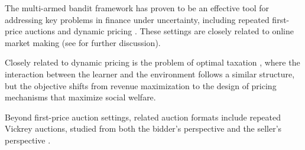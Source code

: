 \documentclass[final,12pt]{colt2025}
\begin{document}
The multi-armed bandit framework has proven to be an effective tool for addressing key problems in finance under uncertainty, including repeated first-price auctions \citep{cesabianchiRoleTransparencyRepeated2024,han2024optimalnoregretlearningrepeated,pmlr-v157-achddou21a,NIPS2017_0bed45bd} and dynamic pricing \citep{cesa2019dynamic,babaioffDynamicPricingLimited2015,kleinberg2003value}. These settings are closely related to online market making (see  for further discussion).

Closely related to dynamic pricing is the problem of optimal taxation \citep{taxation2025}, where the interaction between the learner and the environment follows a similar structure, but the objective shifts from revenue maximization to the design of pricing mechanisms that maximize social welfare.

Beyond first-price auction settings, related auction formats include repeated Vickrey auctions, studied from both the bidder’s perspective \citep{weedOnlineLearningRepeated2015} and the seller’s perspective \citep{cesaSecondPrice}.
\end{document}
